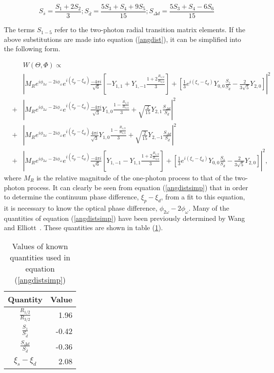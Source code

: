 \begin{equation}
S_{\bar{s}} = \frac{S_1+2S_2}{3} ; S_{\bar{d}} =
\frac{5S_3+S_4+9S_5}{15} ; S_{\Delta d} = \frac{5S_3+S_4-6S_6}{15}
\end{equation}

The terms $S_{1-5}$ refer to the two-photon radial transition
matrix elements.  If the above substitutions are made into
equation (\ref{angdist}), it can be simplified into the following
form.

\begin{eqnarray*}
\label{angdistsimp}
& & W(\Theta,\Phi) \propto\\
& & \left| M_R e^{i\phi_{2 \omega} - 2i\phi_{\omega}}
e^{i(\xi_p-\xi_d)} \frac {-4\pi i}{\sqrt{6}} \left[ -Y_{1,1} +
Y_{1,-1}\frac{1+2 \frac{R_{1/2}}{R_{3/2}}}{3} \right] +
 \left[ \frac{1}{3} e^{i(\xi_s - \xi_d)} Y_{0,0} \frac{S_{\bar{s}}}{S_{\bar{d}}} -\frac{2}{3\sqrt{5}}Y_{2,0} \right] \right|^2  \\
& + & \left|M_R e^{i\phi_{2 \omega} - 2i\phi_{\omega}}
e^{i(\xi_p-\xi_d)} \frac {-4\pi i}{\sqrt{3}} Y_{1,0}\frac{1 -
\frac{R_{1/2}}{R_{3/2}}}{3} +
 \sqrt{\frac{2}{15}} Y_{2,1} \frac{S_{\Delta d}}{S_{\bar{d}}} \right|^2  \\
&  + & \left| M_R e^{i\phi_{2 \omega} - 2i\phi_{\omega}}
e^{i(\xi_p-\xi_d)} \frac {4\pi i}{\sqrt{3}} Y_{1,0} \frac{1 -
\frac{R_{1/2}}{R_{3/2}}}{3} +
 \sqrt{\frac{2}{15}} Y_{2,-1} \frac{S_{\Delta d}}{S_{\bar{d}}} \right|^2 \\
& + & \left| M_R e^{i\phi_{2 \omega} - 2i\phi_{\omega}}
e^{i(\xi_p-\xi_d)} \frac {-4\pi i}{\sqrt{6}} \left[ Y_{1,-1} -
Y_{1,1}\frac{1+2 \frac{R_{1/2}}{R_{3/2}}}{3} \right] +
 \left[ \frac{1}{3} e^{i(\xi_s - \xi_d)} Y_{0,0} \frac{S_{\bar{s}}}{S_{\bar{d}}} -\frac{2}{3\sqrt{5}}Y_{2,0} \right]
 \right|^2,
\end{eqnarray*}where $M_R$ is the relative magnitude of the one-photon process to
that of the two-photon process.  It can clearly be seen from
equation (\ref{angdistsimp}) that in order to determine the
continuum phase difference, $\xi_p-\xi_d$, from a fit to this
equation, it is necessary to know the optical phase difference,
$\phi_{2 \omega} - 2\phi_{\omega}$.
 Many of the quantities of equation (\ref{angdistsimp}) have been
previously determined by Wang and Elliott~\cite{Wang1, Wang2}.
These quantities are shown in table (\ref{angdistvalues}).

\begin{table}[h]
\caption[Known Quantities in Angular Distribution Function]{Values
of known quantities used in equation (\ref{angdistsimp})}
\label{angdistvalues}
  \centering
\begin{tabular}{|c|r|}
\hline
Quantity&Value\\
\hline
$\frac{R_{1/2}}{R_{3/2}}$&1.96\\
$\frac{S_{\bar{s}}}{S_{\bar{d}}}$&-0.42\\
$\frac{S_{\Delta d}}{S_{\bar{d}}}$&-0.36\\
$\xi_s-\xi_d$&2.08\\
\hline
\end{tabular}

\end{table}

